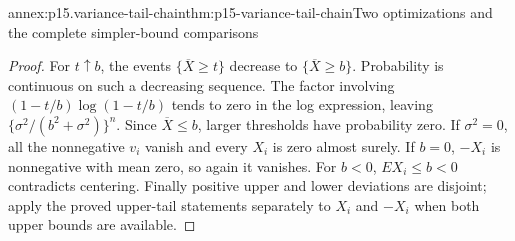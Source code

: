 \begin{annexitem}{annex:p15.variance-tail-chain}{thm:p15-variance-tail-chain}{Two optimizations and the complete simpler-bound comparisons}
\begin{proof}
For \(t\uparrow b\), the events \(\{\overline X\geq t\}\) decrease
to \(\{\overline X\geq b\}\). Probability is continuous on such a
decreasing sequence. The factor involving
\((1-t/b)\log(1-t/b)\) tends to zero in the log expression, leaving
\(\{\sigma^2/(b^2+\sigma^2)\}^n\). Since \(\overline X\leq b\),
larger thresholds have probability zero.
If \(\sigma^2=0\), all the nonnegative \(v_i\) vanish and every \(X_i\)
is zero almost surely. If \(b=0\), \(-X_i\) is nonnegative with mean zero,
so again it vanishes. For \(b<0\), \(EX_i\leq b<0\) contradicts
centering. Finally positive upper and lower deviations are disjoint;
apply the proved upper-tail statements separately to \(X_i\) and
\(-X_i\) when both upper bounds are available.
\end{proof}
\end{annexitem}

